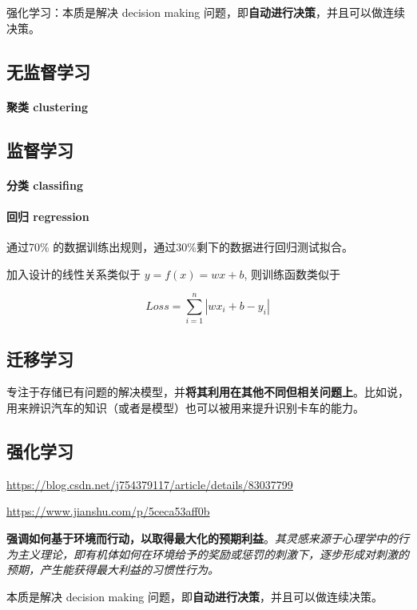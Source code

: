 \documentclass[UTF8,a4paper,12pt]{ctexbook}
\begin{document}
		强化学习：本质是解决 decision making 问题，即\textbf{自动进行决策}，并且可以做连续决策。
	
		\subsection{无监督学习}
			\paragraph{聚类 clustering}
			
		
		\subsection{监督学习}
			\paragraph{分类 classifing}
		
		
			\paragraph{回归 regression}
				通过70\% 的数据训练出规则，通过30\%剩下的数据进行回归测试拟合。	
				
				加入设计的线性关系类似于 $ y = f(x) = wx + b$, 则训练函数类似于
				
				$$ Loss = \sum_{i=1}^{n}|wx_i + b - y_i|$$		
		
		
		\subsection{迁移学习}
			专注于存储已有问题的解决模型，并\textbf{将其利用在其他不同但相关问题上}。比如说，用来辨识汽车的知识（或者是模型）也可以被用来提升识别卡车的能力。
		
		\subsection{强化学习}
			\url{https://blog.csdn.net/j754379117/article/details/83037799}
			
			\url{https://www.jianshu.com/p/5ceca53aff0b}
			
			
			\textbf{强调如何基于环境而行动，以取得最大化的预期利益}。\textit{其灵感来源于心理学中的行为主义理论，即有机体如何在环境给予的奖励或惩罚的刺激下，逐步形成对刺激的预期，产生能获得最大利益的习惯性行为。}
			
			本质是解决 decision making 问题，即\textbf{自动进行决策}，并且可以做连续决策。
			
\end{document}
